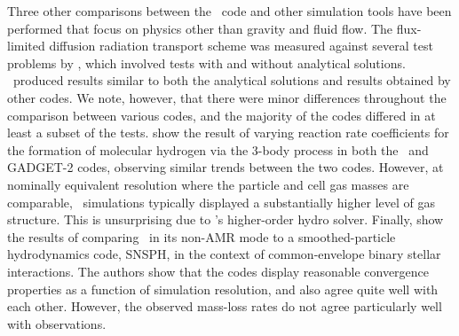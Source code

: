 Three other comparisons between the \enzo\ code and other simulation
tools have been performed that focus on physics other than gravity and
fluid flow.  The flux-limited diffusion radiation transport scheme was
measured against several test problems by \citet{IlievEtAl2009}, which
involved tests with and without analytical solutions.  \enzo\ produced
results similar to both the analytical solutions and results obtained
by other codes.  We note, however, that there were minor differences
throughout the comparison between various codes, and the majority of
the codes differed in at least a subset of the tests.
\citet{2011ApJ...726...55T} show the result of varying reaction rate
coefficients for the formation of molecular hydrogen via the 3-body
process in both the \enzo\ and GADGET-2 codes, observing similar
trends between the two codes. However, at nominally equivalent
resolution where the particle and cell gas masses are comparable,
\enzo\ simulations typically displayed a substantially higher level of
gas structure.  This is unsurprising due to \enzo's higher-order hydro
solver.  Finally, \citet{2012ApJ...744...52P} show the results of
comparing \enzo\ in its non-AMR mode to a smoothed-particle
hydrodynamics code, SNSPH, in the context of common-envelope binary
stellar interactions.  The authors show that the codes display
reasonable convergence properties as a function of simulation
resolution, and also agree quite well with each other. However, the
observed mass-loss rates do not agree particularly well with
observations.
